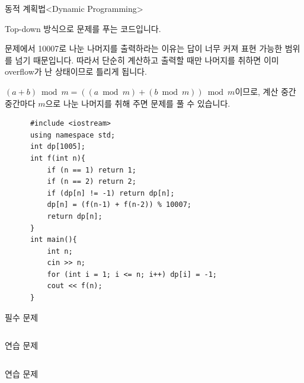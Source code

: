 \begin{frame}[fragile]{동적 계획법}{<Dynamic Programming>}
  \begin{twocol}
    \alert{Top-down 방식}으로 문제를 푸는 코드입니다.\par\vspace{2mm}
    문제에서 10007로 나눈 나머지를 출력하라는 이유는 답이 너무 커져 표현 가능한 범위를
    넘기 때문입니다. 따라서 단순히 계산하고 출력할 때만 나머지를 취하면 이미 overflow가
    난 상태이므로 틀리게 됩니다.\par\vspace{2mm}
    $(a + b) \bmod m = ((a \bmod m) + (b \bmod m)) \bmod m$이므로,
    계산 중간중간마다 $m$으로 나눈 나머지를 취해 주면 문제를 풀 수 있습니다.
  \colsplit
    \begin{verbatim}
      #include <iostream>
      using namespace std;
      int dp[1005];
      int f(int n){
          if (n == 1) return 1;
          if (n == 2) return 2;
          if (dp[n] != -1) return dp[n];
          dp[n] = (f(n-1) + f(n-2)) % 10007;
          return dp[n];
      }
      int main(){
          int n;
          cin >> n;
          for (int i = 1; i <= n; i++) dp[i] = -1;
          cout << f(n);
      }
    \end{verbatim}
  \end{twocol}
\end{frame}

\begin{frame}{필수 문제}
  \begin{columns}[T]
  \end{columns}
\end{frame}

\begin{frame}{연습 문제}
  \begin{columns}[T]
  \end{columns}
\end{frame}

\begin{frame}{연습 문제}
  \begin{columns}[T]
  \end{columns}
\end{frame}

\closingframe


